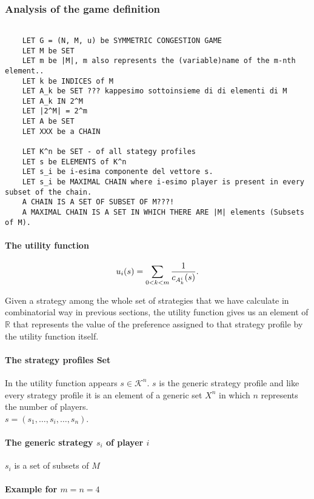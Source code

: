 \documentclass{article}
\begin{document}
\subsubsection{Analysis of the game definition}
\begin{verbatim}

    LET G = (N, M, u) be SYMMETRIC CONGESTION GAME
	LET M be SET
	LET m be |M|, m also represents the (variable)name of the m-nth element..
	LET k be INDICES of M
	LET A_k be SET ??? kappesimo sottoinsieme di di elementi di M
	LET A_k IN 2^M
	LET |2^M| = 2^m
	LET A be SET
	LET XXX be a CHAIN
	
	LET K^n be SET - of all stategy profiles
	LET s be ELEMENTS of K^n
	LET s_i be i-esima componente del vettore s.
	LET s_i be MAXIMAL CHAIN where i-esimo player is present in every subset of the chain.
	A CHAIN IS A SET OF SUBSET OF M???!
	A MAXIMAL CHAIN IS A SET IN WHICH THERE ARE |M| elements (Subsets of M).
\end{verbatim}

\paragraph{The utility function}
$$u_i(s)=\sum_{0<k<m}\frac{1}{c_{A^i_k}(s)}\text .$$

Given a strategy among the whole set of strategies that we have calculate in combinatorial way in previous sections, the utility function gives us an element of $\mathbb{R}$ that represents the value of the preference assigned to that strategy profile by the utility function itself. \\

\paragraph{The strategy profiles Set}
In the utility function appears $s \in \mathcal{K}^n$. $s$ is the generic strategy profile and like every strategy profile it is an element of a generic set $X^n$ in which $n$ represents the number of players. \\
$s = (s_1, \ldots, s_i, \ldots, s_n)$.

\paragraph{The generic strategy $s_i$ of player $i$}
$s_i$ is a set of subsets of $M$

\paragraph{Example for $m=n=4$}
\end{document}
